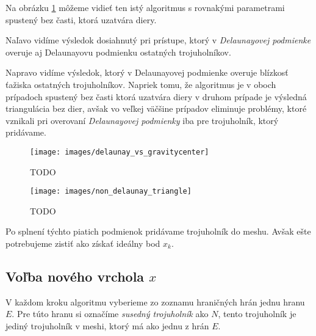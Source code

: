\begin{enumerate}
{         Na obrázku \ref{obr:delaunay_vs_gravitycenter} môžeme vidieť ten 
         istý algoritmus s rovnakými parametrami spustený bez časti, ktorá uzatvára diery. 
         
         Naľavo vidíme výsledok dosiahnutý pri prístupe, ktorý v \textit{Delaunayovej podmienke} overuje aj
         Delaunayovu podmienku ostatných trojuholníkov. 
         
         Napravo vidíme výsledok, ktorý v Delaunayovej
         podmienke overuje blízkosť ťažiska ostatných trojuholníkov. Napriek tomu, že algoritmus
         je v oboch prípadoch spustený bez časti ktorá uzatvára diery v druhom prípade je výsledná 
         triangulácia bez dier, avšak vo veľkej väčšine prípadov eliminuje problémy, ktoré vznikali 
         pri overovaní \textit{Delaunayovej podmienky} iba pre trojuholník, ktorý pridávame.
     }

    \begin{figure}
        \centerline{\texttt{[image: images/delaunay\_vs\_gravitycenter]}}
        \caption[]{TODO}
        \label{obr:delaunay_vs_gravitycenter}
    \end{figure}

    \begin{figure}
        \centerline{\texttt{[image: images/non\_delaunay\_triangle]}}
        \caption[]{TODO}
        \label{obr:non_delaunay_triangle}
    \end{figure}
\end{enumerate}

Po splnení týchto piatich podmienok pridávame trojuholník do meshu. Avšak ešte potrebujeme zistiť 
ako získať ideálny bod $x_k$.

\subsection{Voľba nového vrchola $x$}
\label{kap:finding_new_vertex}

V každom kroku algoritmu vyberieme zo zoznamu hraničných hrán jednu hranu $E$. Pre túto hranu si 
označíme \textit{susedný trojuholník} ako $N$, tento trojuholník je jediný trojuholník v meshi, 
ktorý má ako jednu z hrán $E$. 


